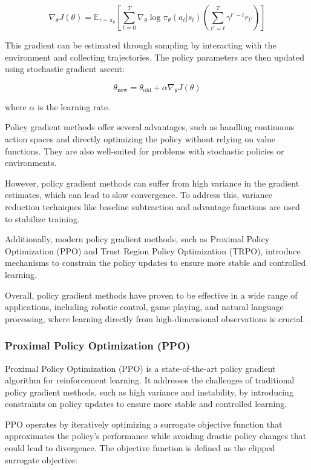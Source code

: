 \[\nabla_{\theta} J(\theta) = \mathbb{E}_{\tau \sim \pi_{\theta}} \left[ \sum_{t=0}^{T} \nabla_{\theta} \log \pi_{\theta}(a_t|s_t) \left( \sum_{t'=t}^{T} \gamma^{t'-t} r_{t'} \right) \right]\]

This gradient can be estimated through sampling by interacting with the environment and collecting trajectories.
The policy parameters are then updated using stochastic gradient ascent:

\[\theta_{\text{new}} = \theta_{\text{old}} + \alpha \nabla_{\theta} J(\theta)\]

where \(\alpha\) is the learning rate.

Policy gradient methods offer several advantages, such as handling continuous action spaces and directly optimizing the policy without relying on value functions. They are also well-suited for problems with stochastic policies or environments.

However, policy gradient methods can suffer from high variance in the gradient estimates, which can lead to slow convergence. To address this, variance reduction techniques like baseline subtraction and advantage functions are used to stabilize training.

Additionally, modern policy gradient methods, such as Proximal Policy Optimization (PPO) and Trust Region Policy Optimization (TRPO), introduce mechanisms to constrain the policy updates to ensure more stable and controlled learning.

Overall, policy gradient methods have proven to be effective in a wide range of applications, including robotic control, game playing, and natural language processing, where learning directly from high-dimensional observations is crucial.

\subsubsection{Proximal Policy Optimization (PPO)}
Proximal Policy Optimization (PPO) is a state-of-the-art policy gradient algorithm for reinforcement learning. It addresses the challenges of traditional policy gradient methods, such as high variance and instability, by introducing constraints on policy updates to ensure more stable and controlled learning.

PPO operates by iteratively optimizing a surrogate objective function that approximates the policy's performance while avoiding drastic policy changes that could lead to divergence. The objective function is defined as the clipped surrogate objective:

